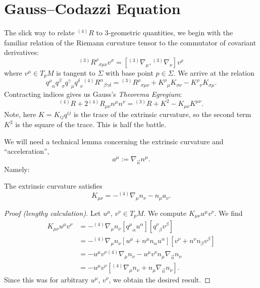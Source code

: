 \section{Gauss--Codazzi Equation}

The slick way to relate ${}^{(4)}R$ to 3-geometric quantities, we begin
with the familiar relation of the Riemann curvature tensor to the
commutator of covariant derivatives:
\begin{equation}
{}^{(3)}{R^{\rho}}_{\sigma\mu\nu}v^{\sigma}
  = [{}^{(3)}\nabla_{\mu}, {}^{(3)}\nabla_{\nu}]v^{\rho}
\end{equation}
where $v^{\mu}\in T_{p}M$ is tangent to $\Sigma$ with base point
$p\in\Sigma$.
We arrive at the relation
\begin{equation}
{q^{\rho}}_{\alpha}{q^{\beta}}_{\sigma}{q^{\gamma}}_{\mu}{q^{\delta}}_{\nu}
{{}^{(4)}\!}{R^{\alpha}}_{\beta\gamma\delta}
={{}^{(3)}\!}{R^{\rho}}_{\sigma\mu\nu} + {K^{\rho}}_{\mu}K_{\sigma\nu}-{K^{\rho}}_{\nu}K_{\sigma\mu}.
\end{equation}
Contracting indices gives us Gauss's \textit{Theorema Egregium}:
\begin{equation}\label{eq:gauss-codazzi:theorem-egregium}
\boxed{{{}^{(4)}\!}{R} + 2{{}^{(4)}\!}{R}_{\mu\nu}n^{\mu}n^{\nu}
={{}^{(3)}\!}{R} + K^{2} - K_{\mu\nu}K^{\mu\nu}.}
\end{equation}
Note, here $K=K_{ij}q^{ij}$ is the trace of the extrinsic curvature, so
the second term $K^{2}$ is the square of the trace.
This is half the battle.

We will need a technical lemma concerning the extrinsic curvature and
``acceleration'',
\begin{equation}
a^{\mu} := \nabla_{\vec{n}}n^{\mu}.
\end{equation}
Namely:
\begin{lemma}
  The extrinsic curvature satisfies
  \begin{equation}
K_{\mu\nu}=-{}^{(4)}\nabla_{\mu}n_{\nu}-n_{\mu}a_{\nu}.
  \end{equation}
\end{lemma}
\begin{proof}[Proof (lengthy calculation)]
Let $u^{\mu}$, $v^\nu\in T_{p}M$. We compute
$K_{\mu\nu}u^{\mu}v^{\nu}$. We find
\begin{subequations}
\begin{align}
K_{\mu\nu}u^{\mu}v^{\nu} &= -{}^{(4)}\nabla_{\mu}n_{\nu}[{q^{\mu}}_{\alpha}u^{\alpha}]
[{q^{\nu}}_{\beta}v^{\beta}]\\
&= -{}^{(4)}\nabla_{\mu}n_{\nu}
[u^{\mu} + n^{\mu}n_{\alpha}u^{\alpha}]
[v^{\nu} + n^{\nu}n_{\beta}v^{\beta}]\\
&=-u^{\mu}v^{\nu}{}^{(4)}\nabla_{\mu}n_{\nu}-u^{\mu}v^{\nu}n_{\mu}\nabla_{\vec{n}}n_{\nu}\\
&=-u^{\mu}v^{\nu}[{}^{(4)}\nabla_{\mu}n_{\nu} + n_{\mu}\nabla_{\vec{n}}n_{\nu}].
\end{align}
\end{subequations}
Since this was for arbitrary $u^{\mu}$, $v^{\nu}$, we obtain the desired result.
\end{proof}

